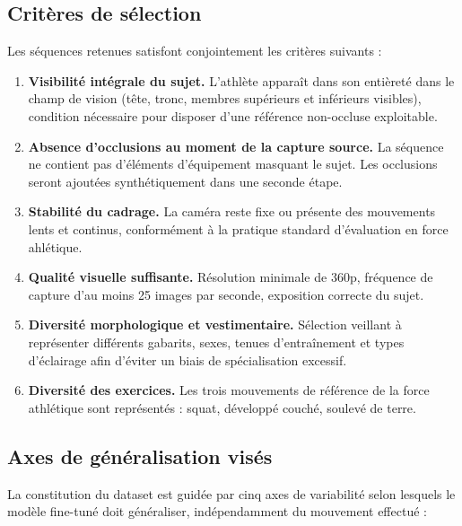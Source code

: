 \subsection{Critères de sélection}

Les séquences retenues satisfont conjointement les critères suivants :

\begin{enumerate}
  \item \textbf{Visibilité intégrale du sujet.} L'athlète apparaît dans son entièreté dans le champ de vision (tête, tronc, membres supérieurs et inférieurs visibles), condition nécessaire pour disposer d'une référence non-occluse exploitable.
  \item \textbf{Absence d'occlusions au moment de la capture source.} La séquence ne contient pas d'éléments d'équipement masquant le sujet. Les occlusions seront ajoutées synthétiquement dans une seconde étape.
  \item \textbf{Stabilité du cadrage.} La caméra reste fixe ou présente des mouvements lents et continus, conformément à la pratique standard d'évaluation en force ahlétique.
  \item \textbf{Qualité visuelle suffisante.} Résolution minimale de 360p, fréquence de capture d'au moins 25 images par seconde, exposition correcte du sujet.
  \item \textbf{Diversité morphologique et vestimentaire.} Sélection veillant à représenter différents gabarits, sexes, tenues d'entraînement et types d'éclairage afin d'éviter un biais de spécialisation excessif.
  \item \textbf{Diversité des exercices.} Les trois mouvements de référence de la force athlétique sont représentés : squat, développé couché, soulevé de terre.
\end{enumerate}

\subsection{Axes de généralisation visés}

La constitution du dataset est guidée par cinq axes de variabilité selon lesquels le modèle fine-tuné doit généraliser, indépendamment du mouvement effectué :

